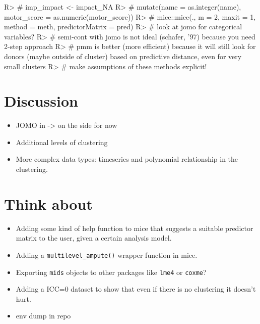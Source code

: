 \documentclass[
]{jss}
\begin{document}
\begin{CodeChunk}
\begin{CodeInput}
R> # imp_impact <- impact_NA %
R> #   mutate(name = as.integer(name), motor_score = as.numeric(motor_score)) %
R> #   mice::mice(., m = 2, maxit = 1, method = meth, predictorMatrix = pred)
R> # look at jomo for categorical variables?
R> # semi-cont with jomo is not ideal (schafer, '97) because you need 2-step approach
R> # pmm is better (more efficient) because it will still look for donors (maybe outside of cluster) based on predictive distance, even for very small clusters
R> # make assumptions of these methods explicit!
\end{CodeInput}
\end{CodeChunk}

\hypertarget{discussion}{%
\section{Discussion}\label{discussion}}

\begin{itemize}
\item
  JOMO in  -\textgreater{} on the side for now
\item
  Additional levels of clustering
\item
  More complex data types: timeseries and polynomial relationship in the
  clustering.
\end{itemize}

\hypertarget{think-about}{%
\section{Think about}\label{think-about}}

\begin{itemize}
\item
  Adding some kind of help function to mice that suggests a suitable
  predictor matrix to the user, given a certain analysis model.
\item
  Adding a \texttt{multilevel\_ampute()} wrapper function in mice.
\item
  Exporting \texttt{mids} objects to other packages like \texttt{lme4}
  or \texttt{coxme}?
\item
  Adding a ICC=0 dataset to show that even if there is no clustering it
  doesn't hurt.
\item
  env dump in repo
\end{itemize}

\renewcommand\refname{References}

\end{document}
